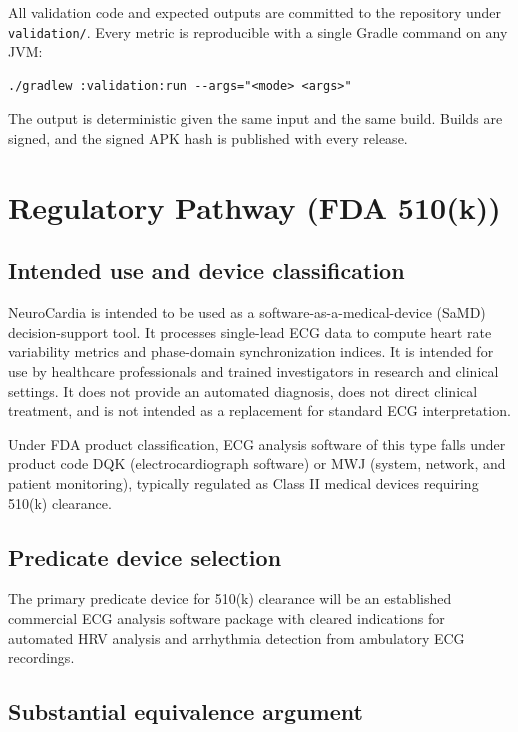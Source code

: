 \documentclass[11pt]{article}
\begin{document}
All validation code and expected outputs are committed to the
repository under \texttt{validation/}. Every metric is reproducible
with a single Gradle command on any JVM:
\begin{verbatim}
./gradlew :validation:run --args="<mode> <args>"
\end{verbatim}
The output is deterministic given the same input and the same build.
Builds are signed, and the signed APK hash is published with every
release.

\section{Regulatory Pathway (FDA 510(k))}\label{sec:regulatory}

\subsection{Intended use and device classification}

NeuroCardia is intended to be used as a software-as-a-medical-device
(SaMD) decision-support tool. It processes single-lead ECG data to
compute heart rate variability metrics and phase-domain synchronization
indices. It is intended for use by healthcare professionals and trained
investigators in research and clinical settings. It does not provide an
automated diagnosis, does not direct clinical treatment, and is not
intended as a replacement for standard ECG interpretation.

Under FDA product classification, ECG analysis software of this type
falls under product code DQK (electrocardiograph software) or MWJ
(system, network, and patient monitoring), typically regulated as
Class II medical devices requiring 510(k) clearance.

\subsection{Predicate device selection}

The primary predicate device for 510(k) clearance will be an
established commercial ECG analysis software package with cleared
indications for automated HRV analysis and arrhythmia detection from
ambulatory ECG recordings.

\subsection{Substantial equivalence argument}
\end{document}
